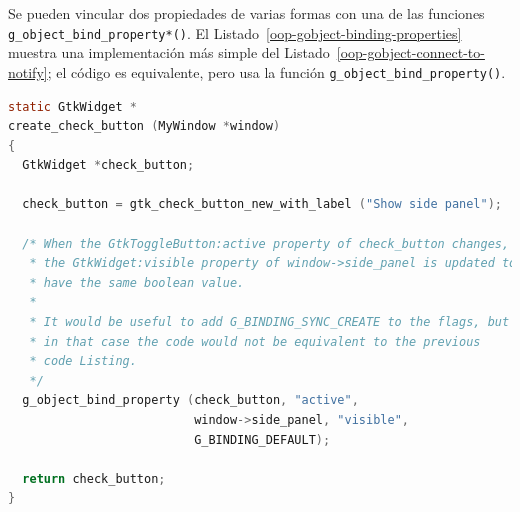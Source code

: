 Se pueden vincular dos propiedades de varias formas con una de las funciones \lstinline{g_object_bind_property*()}. El Listado~\ref{oop-gobject-binding-properties} muestra una implementación más simple del Listado~\ref{oop-gobject-connect-to-notify}; el código es equivalente, pero usa la función \lstinline{g_object_bind_property()}.

\vspace{0.7cm}
\begin{lstlisting}[language=C, caption={Vinculando dos propiedades.}, label=oop-gobject-binding-properties]
static GtkWidget *
create_check_button (MyWindow *window)
{
  GtkWidget *check_button;

  check_button = gtk_check_button_new_with_label ("Show side panel");

  /* When the GtkToggleButton:active property of check_button changes,
   * the GtkWidget:visible property of window->side_panel is updated to
   * have the same boolean value.
   *
   * It would be useful to add G_BINDING_SYNC_CREATE to the flags, but
   * in that case the code would not be equivalent to the previous
   * code Listing.
   */
  g_object_bind_property (check_button, "active",
                          window->side_panel, "visible",
                          G_BINDING_DEFAULT);

  return check_button;
}
\end{lstlisting}
